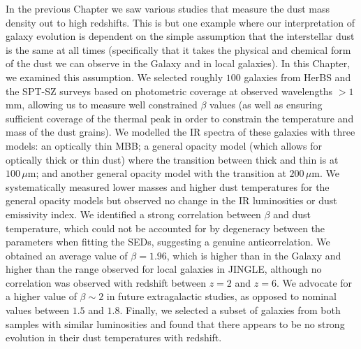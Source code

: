 In the previous Chapter we saw various studies that measure the dust mass density out to high redshifts. This is but one example where our interpretation of galaxy evolution is dependent on the simple assumption that the interstellar dust is the same at all times (specifically that it takes the physical and chemical form of the dust we can observe in the Galaxy and in local galaxies). In this Chapter, we examined this assumption. We selected roughly $100$ galaxies from HerBS and the SPT-SZ surveys based on photometric coverage at observed wavelengths $>1\,$mm, allowing us to measure well constrained $\beta$ values (as well as ensuring sufficient coverage of the thermal peak in order to constrain the temperature and mass of the dust grains). We modelled the IR spectra of these galaxies with three models: an optically thin MBB; a general opacity model (which allows for optically thick or thin dust) where the transition between thick and thin is at $100\,\mu$m; and another general opacity model with the transition at $200\,\mu$m. We systematically measured lower masses and higher dust temperatures for the general opacity models but observed no change in the IR luminosities or dust emissivity index. We identified a strong correlation between $\beta$ and dust temperature, which could not be accounted for by degeneracy between the parameters when fitting the SEDs, suggesting a genuine anticorrelation. We obtained an average value of $\beta = 1.96$, which is higher than in the Galaxy and higher than the range observed for local galaxies in JINGLE, although no correlation was observed with redshift between $z = 2$ and $z = 6$. We advocate for a higher value of $\beta \sim 2$ in future extragalactic studies, as opposed to nominal values between $1.5$ and $1.8$. Finally, we selected a subset of galaxies from both samples with similar luminosities and found that there appears to be no strong evolution in their dust temperatures with redshift.
